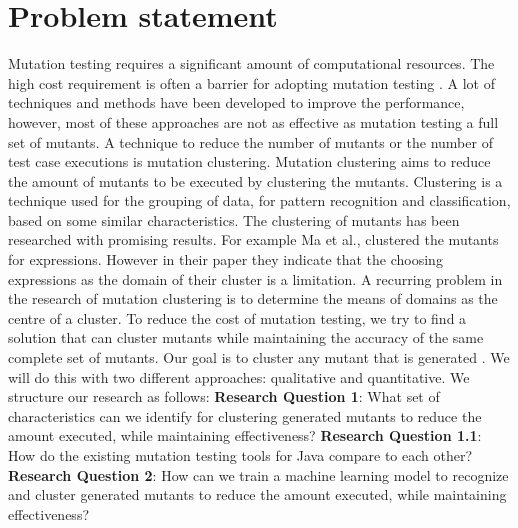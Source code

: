 \documentclass[../main]{subfiles}
\begin{document}
\section{Problem statement}
Mutation testing requires a significant amount of computational resources\cite{Kintis2016EffectiveMutation}. 
The high cost requirement is often a barrier for adopting mutation testing \cite{Pizzoleto2019}.
A lot of techniques and methods have been developed to improve the performance, however, most of these approaches are not as effective as mutation testing a full set of mutants\cite{Pizzoleto2019,Yao2014}. 
\newline
A technique to reduce the number of mutants or the number of test case executions is mutation clustering.
Mutation clustering aims to reduce the amount of mutants to be executed by clustering the mutants\cite{Ma2016,Yu2019PossibilityScope}.
Clustering is a technique used for the grouping of data, for pattern recognition and classification, based on some similar characteristics\cite{Alsabti1997}.
The clustering of mutants has been researched with promising results\cite{Ji2009,Wilinski2015,Ma2016}. For example Ma et al., \cite{Ma2016} clustered the mutants for expressions. 
However in their paper they indicate that the choosing expressions as the domain of their cluster is a limitation.
A recurring problem in the research of mutation clustering is to determine the means of domains as the centre of a cluster\cite{Ji2009,Wilinski2015,Ma2016,Wei2021SpectralTesting}.
\newline
To reduce the cost of mutation testing, we try to find a solution that can cluster mutants while maintaining the accuracy of the same complete set of mutants. 
Our goal is to cluster any mutant that is generated .
We will do this with two different approaches: qualitative and quantitative. 
We structure our research as follows:
\newline
\textbf{Research Question 1}: What set of characteristics can we identify for clustering generated mutants to reduce the amount executed, while maintaining effectiveness?
\newline
\textbf{Research Question 1.1}: How do the existing mutation testing tools for Java compare to each other?
\newline
\textbf{Research Question 2}: How can we train a machine learning model to recognize and cluster generated mutants to reduce the amount executed, while maintaining effectiveness?
\end{document}
